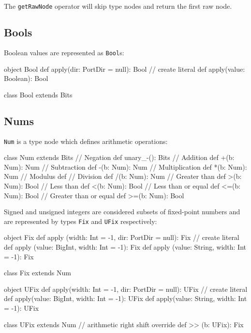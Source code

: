\documentclass[10pt,twocolumn]{article}
\def\code#1{{\small\tt #1}}
\begin{document}
\noindent
The \code{getRawNode} operator will skip type nodes and return the first
raw node.

\subsection{Bools}

Boolean values are represented as \code{Bool}s:

\begin{scala}
object Bool {
  def apply(dir: PortDir = null): Bool
  // create literal
  def apply(value: Boolean): Bool
}

class Bool extends Bits {
}
\end{scala}

\subsection{Nums}

\code{Num} is a type node which defines arithmetic operations:

\begin{scala}
class Num extends Bits {
  // Negation
  def unary_-(): Bits
  // Addition
  def +(b: Num): Num
  // Subtraction
  def -(b: Num): Num
  // Multiplication
  def *(b: Num): Num
  // Modulus
  def %
  // Division
  def /(b: Num): Num
  // Greater than
  def >(b: Num): Bool
  // Less than
  def <(b: Num): Bool
  // Less than or equal
  def <=(b: Num): Bool
  // Greater than or equal
  def >=(b: Num): Bool
}
\end{scala}

Signed and unsigned integers
are considered subsets of fixed-point numbers and are represented by
types \code{Fix} and \code{UFix} respectively:

\begin{scala}
object Fix {
  def apply (width: Int = -1, 
             dir: PortDir = null): Fix
  // create literal
  def apply (value: BigInt, width: Int = -1): Fix
  def apply (value: String, width: Int = -1): Fix
}

class Fix extends Num 

object UFix {
  def apply(width: Int = -1, 
            dir: PortDir = null): UFix
  // create literal
  def apply(value: BigInt, width: Int = -1): UFix
  def apply(value: String, width: Int = -1): UFix
}

class UFix extends Num {
  // arithmetic right shift
  override def >> (b: UFix): Fix
}
\end{scala}
\end{document}
